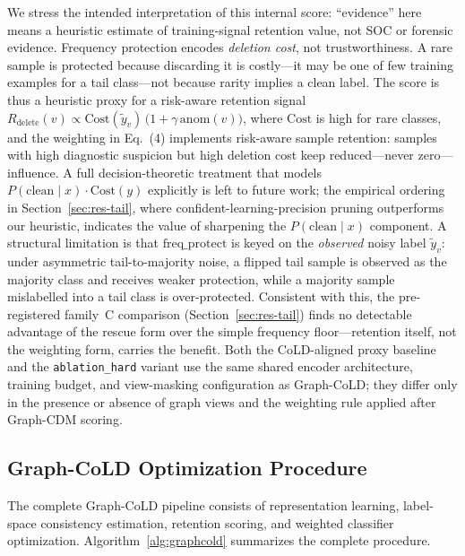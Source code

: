 \documentclass[pdflatex,referee,lineno,sn-basic,Numbered]{sn-jnl}
\begin{document}
We stress the intended interpretation of this internal score: ``evidence'' here
means a heuristic estimate of training-signal retention value, not SOC or
forensic evidence. Frequency protection encodes \emph{deletion cost}, not
trustworthiness. A rare sample is protected because discarding it is costly---it
may be one of few training examples for a tail class---not because rarity implies
a clean label.
The score is thus a heuristic proxy for a risk-aware retention signal
$R_{\text{delete}}(v)\propto \mathrm{Cost}(\tilde{y}_v)\,\big(1+\gamma\,\text{anom}(v)\big)$,
where $\mathrm{Cost}$ is high for rare classes, and the weighting in
Eq.~(4) implements risk-aware sample retention: samples with high diagnostic
suspicion but high deletion cost keep reduced---never zero---influence.
A full decision-theoretic treatment that models
$P(\text{clean}\mid x)\cdot\mathrm{Cost}(y)$ explicitly is left to future work;
the empirical ordering in Section~\ref{sec:res-tail}, where
confident-learning-precision pruning outperforms our heuristic, indicates the
value of sharpening the $P(\text{clean}\mid x)$ component.
A structural limitation is that $\text{freq\_protect}$ is keyed on the
\emph{observed} noisy label $\tilde{y}_v$: under asymmetric tail-to-majority
noise, a flipped tail sample is observed as the majority class and receives
weaker protection, while a majority sample mislabelled into a tail class is
over-protected. Consistent with this, the pre-registered family~C comparison
(Section~\ref{sec:res-tail}) finds no detectable advantage of the rescue form
over the simple frequency floor---retention itself, not the weighting form,
carries the benefit.
Both the CoLD-aligned proxy baseline and the \texttt{ablation\_hard} variant use the
same shared encoder architecture, training budget, and view-masking configuration
as Graph-CoLD; they differ only in the presence or absence of graph views and the
weighting rule applied after Graph-CDM scoring.


\subsection{Graph-CoLD Optimization Procedure}

The complete Graph-CoLD pipeline consists of representation learning,
label-space consistency estimation, retention scoring, and weighted classifier
optimization. Algorithm~\ref{alg:graphcold} summarizes the complete procedure.
\end{document}
